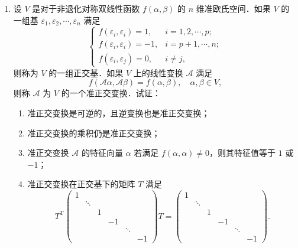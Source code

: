 \begin{enumerate}
  \item 设 $V$ 是对于非退化对称双线性函数 $f(\alpha,\beta)$ 的 $n$ 维准欧氏空间．如果 $V$ 的一组基 $\varepsilon_1,\varepsilon_2,\cdots,\varepsilon_n$ 满足
  \[
    \begin{cases}
      f(\varepsilon_i,\varepsilon_i)=1, & i=1,2,\cdots,p;\\
      f(\varepsilon_i,\varepsilon_i)=-1, & i=p+1,\cdots,n;\\
      f(\varepsilon_i,\varepsilon_j)=0, & i\neq j,
    \end{cases}
  \]
  则称为 $V$ 的一组正交基．如果 $V$ 上的线性变换 $\mathcal{A}$ 满足
  \[
    f(\mathcal{A}\alpha,\mathcal{A}\beta)=f(\alpha,\beta),\quad \alpha,\beta\in V,
  \]
  则称 $\mathcal{A}$ 为 $V$ 的一个准正交变换．试证：
  \begin{enumerate}
    \item 准正交变换是可逆的，且逆变换也是准正交变换；
  \anssub
    \item 准正交变换的乘积仍是准正交变换；
  \anssub
    \item 准正交变换 $\mathcal{A}$ 的特征向量 $\alpha$ 若满足 $f(\alpha,\alpha)\neq 0$，则其特征值等于 $1$ 或 $-1$；
  \anssub
    \item 准正交变换在正交基下的矩阵 $T$ 满足
    \[
      T^{\mathrm{T}}
      \begin{pmatrix}
        1 & & & & & \\
         & \ddots & & & & \\
         & & 1 & & & \\
         & & & -1 & & \\
         & & & & \ddots & \\
         & & & & & -1
      \end{pmatrix}
      T=
      \begin{pmatrix}
        1 & & & & & \\
         & \ddots & & & & \\
         & & 1 & & & \\
         & & & -1 & & \\
         & & & & \ddots & \\
         & & & & & -1
      \end{pmatrix}.
    \]
  \anssub
  \end{enumerate}
\end{enumerate}
